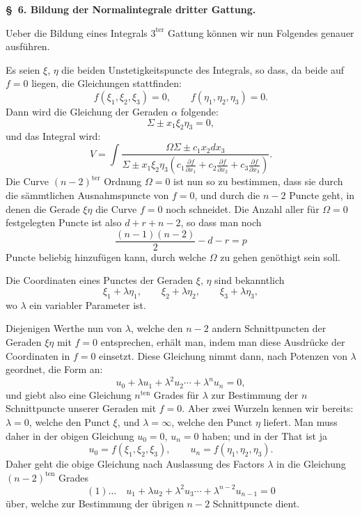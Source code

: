 \documentclass[10pt]{article}
\begin{document}
\begin{center}
{\bfseries \S\ 6. Bildung der Normalintegrale dritter Gattung.}
\end{center}

Ueber die Bildung eines Integrals $3^{\mathrm{ter}}$ Gattung können wir nun Folgendes genauer ausführen.

Es seien $\xi$, $\eta$ die beiden Unstetigkeitspuncte des Integrals, so dass, da beide auf $f=0$ liegen, die Gleichungen stattfinden:
\[
f(\xi_1,\xi_2,\xi_3)=0,
\qquad
f(\eta_1,\eta_2,\eta_3)=0.
\]
Dann wird die Gleichung der Geraden $\alpha$ folgende:
\[
\Sigma\pm x_1\xi_2\eta_3=0,
\]
und das Integral wird:
\[
V=\int\frac{\Omega\Sigma\pm c_1x_2dx_3}{\Sigma\pm x_1\xi_2\eta_3\left(c_1\frac{\partial f}{\partial x_1}+c_2\frac{\partial f}{\partial x_2}+c_3\frac{\partial f}{\partial x_3}\right)}.
\]
Die Curve $(n-2)^{\mathrm{ter}}$ Ordnung $\Omega=0$ ist nun so zu bestimmen, dass sie durch die sämmtlichen Ausnahmspuncte von $f=0$, und durch die $n-2$ Puncte geht, in denen die Gerade $\xi\eta$ die Curve $f=0$ noch schneidet. Die Anzahl aller für $\Omega=0$ festgelegten Puncte ist also $d+r+n-2$, so dass man noch
\[
\frac{(n-1)(n-2)}{2}-d-r=p
\]
Puncte beliebig hinzufügen kann, durch welche $\Omega$ zu gehen genöthigt sein soll.

Die Coordinaten eines Punctes der Geraden $\xi$, $\eta$ sind bekanntlich
\[
\xi_1+\lambda\eta_1,
\qquad
\xi_2+\lambda\eta_2,
\qquad
\xi_3+\lambda\eta_3,
\]
wo $\lambda$ ein variabler Parameter ist.

Diejenigen Werthe nun von $\lambda$, welche den $n-2$ andern Schnittpuncten der Geraden $\xi\eta$ mit $f=0$ entsprechen, erhält man, indem man diese Ausdrücke der Coordinaten in $f=0$ einsetzt. Diese Gleichung nimmt dann, nach Potenzen von $\lambda$ geordnet, die Form an:
\[
u_0+\lambda u_1+\lambda^2u_2\cdots+\lambda^nu_n=0,
\]
und giebt also eine Gleichung $n^{\mathrm{ten}}$ Grades für $\lambda$ zur Bestimmung der $n$ Schnittpuncte unserer Geraden mit $f=0$. Aber zwei Wurzeln kennen wir bereits: $\lambda=0$, welche den Punct $\xi$, und $\lambda=\infty$, welche den Punct $\eta$ liefert. Man muss daher in der obigen Gleichung $u_0=0$, $u_n=0$ haben; und in der That ist ja
\[
u_0=f(\xi_1,\xi_2,\xi_3),
\qquad
u_n=f(\eta_1,\eta_2,\eta_3).
\]
Daher geht die obige Gleichung nach Auslassung des Factors $\lambda$ in die Gleichung $(n-2)^{\mathrm{ten}}$ Grades
\[
(1)\ldots\quad u_1+\lambda u_2+\lambda^2u_3\cdots+\lambda^{n-2}u_{n-1}=0
\]
über, welche zur Bestimmung der übrigen $n-2$ Schnittpuncte dient.
\end{document}
